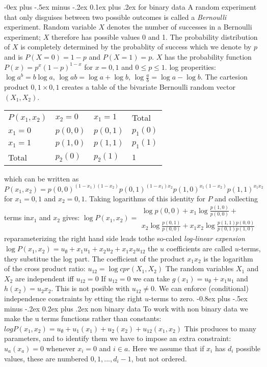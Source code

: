\documentclass[12pt,landscape]{extarticle}
\makeatletter
\renewcommand{\subsection}{\@startsection{subsection}{2}{0mm}%
                                {-0.8ex plus -.5ex minus -.2ex}%
                                {0.2ex plus .2ex}%
                                {\normalfont\normalsize\bfseries}}
\renewcommand{\subsubsection}{\@startsection{subsubsection}{3}{0mm}%
                                {-0ex plus -.5ex minus -.2ex}%
                                {0.1ex plus .2ex}%
                                {\normalfont\small\bfseries}}
\makeatother
\begin{document}
\begin{multicols}{3}
\subsubsection{for binary data}
A random experiment that only disguises between two possible outcomes is
called a \emph{Bernoulli} experiment. Random variable $X$ denotes the number of
successes in a Bernoulli experiment; $X$ therefore has possible values 0 and 1.
The probability distribution of $X$ is completely determined by the probablity of
success which we denote by $p$  and is $P(X=0) = 1 - p $ and $ P(X=1)=p$.
$X$ has the probability function $P(x)=p^x(1-p)^{1-x}$ for $x=0,1$ and
$0 \leq p \leq 1$.
log properities: $\log a^b=b \log a$, $\log ab = \log a + \log b$,
$\log \frac{a}{b}=\log a - \log b$.
The cartesion product 
${0,1} \times {0,1}$ creates a table of the bivariate Bernoulli random
vector $(X_1,X_2)$.
\begin{tabular}{llll}
  $P(x_1,x_2)$ & $x_2=0$ & $x_1=1$ & Total \\
  $x_1=0$ & $p(0,0)$ & $p(0,1)$ & $p_1(0)$ \\
  $x_1=1$ & $p(1,0)$ & $p(1,1)$ & $p_1(1)$ \\
  Total & $p_2(0)$ & $p_2(1)$ & $1$ \\
\end{tabular}
which can be written as
$P(x_1,x_2)=p(0,0)^{(1-x_1)(1-x_2)}p(0,1)^{(1-x_1)x_2}p(1,0)^{x_1(1-x_2)}p(1,1)^{x_1x_2}$
for $x_1=0,1$ and $x_2=0,1$.
Taking logarithms of this identity for $P$ and collecting terms in$x_1$ and
$x_2$ gives:
$\log P(x_1,x_2)= \begin{matrix}
    \log p(0,0) + x_1 \log \frac{p(1,0)}{p(0,0)} +  \\
    x_2 \log \frac{p(0,1)}{p(0,0)} + x_1 x_2 \log \frac{p(1,1)p(0,0)}{p(0,1)p(1,0)}
    \end{matrix}
$
reparameterizing the right hand side leads tothe so-caled \emph{log-linear expension}
$\log P(x_1,x_2)=u_\emptyset+ x_1u_1 + x_2 u_2 + x_1 x_2 u_{12}$
the $u$ coefficients are called $u$-terms, they substitue the log part.
The coefficient of the product $x_1x_2$ is the logarithm of the cross product
ratio:
$u_{12}=\log cpr(X_1,X_2)$
The random variables $X_1$ and $X_2$ are independent iff $u_{12}=0$
If $u_{12}=0$ we can take $g(x_1)=u_\emptyset + x_1 u_1$ and $h(x_2)= u_2 x_2$.
This is not posible with $u_{12}\neq 0$.
We can enforce (conditional) independence constraints by etting the right
$u$-terms to zero.
\subsection{non binary data}
To work with non binary data we make the u terms functions rather than constants:
$log P(x_1,x_2)=u_\emptyset + u_1(x_1) + u_2(x_2) + u_{12}(x_1,x_2)$
This produces to many parameters, and to identify them we have to impose
an extra constraint: $u_a(x_a)=0$ whenever $x_i=0$ and $i\in a$. Here we
assume that if $x_i$ has $d_i$ possible values, these are numbered
$0,1,...,d_i-1$, but not ordered.

\end{multicols}
\end{document}
